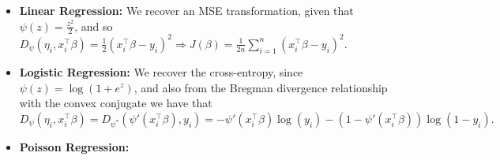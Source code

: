 \documentclass[11pt]{article}
\theoremstyle{plain}
\theoremstyle{definition}
\newcommand{\1}{\mathbf{1}}
\renewcommand{\t}{^{\top}}
\begin{document}
{\begin{tcolorbox}[
    colback=lightgray, %
    width=\linewidth, %
    sharp corners=all %
]
\begin{itemize}
    \item \textbf{Linear Regression:} We recover an MSE transformation, given that $\psi(z)=\frac{z^2}{2}$, and so $D_\psi(\eta_i,x_i\t\beta)=\frac{1}{2}(x_i\t\beta - y_i)^2 \Rightarrow J(\beta)=\frac{1}{2n}\sum_{i=1}^n (x_i\t\beta - y_i)^2$. 
    \item \textbf{Logistic Regression:} We recover the cross-entropy, since $\psi(z)=\log{(1+e^z)}$, and also from the Bregman divergence relationship with the convex conjugate we have that  $D_\psi(\eta_i,x_i\t\beta)=D_{\psi^*}(\psi'(x_i\t\beta), y_i)=-\psi'(x_i\t\beta)\log(y_i)-(1-\psi'(x_i\t\beta))\log(1-y_i).$
    \item \textbf{Poisson Regression:} 
\end{itemize}
\end{tcolorbox}

}
\end{document}
